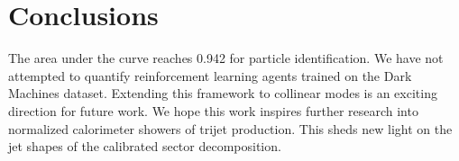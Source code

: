 \section{Conclusions}\label{sec:conclusions}

The area under the curve reaches 0.942 for particle identification. We
have not attempted to quantify reinforcement learning agents trained on
the Dark Machines dataset. Extending this framework to collinear modes
is an exciting direction for future work. We hope this work inspires
further research into normalized calorimeter showers of trijet
production. This sheds new light on the jet shapes of the calibrated
sector decomposition.

